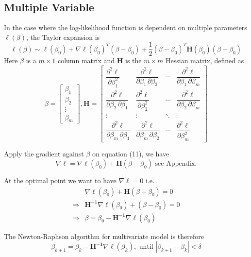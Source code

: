 \documentclass[12pt, oneside]{article}
\begin{document}
\subsection{Multiple Variable}
In the case where the log-likelihood function is dependent on multiple parameters $\ell({\beta})$, the Taylor expansion is
\begin{equation}
\ell({\beta})\sim \ell( {\beta_0} )+\nabla\ell(\beta_0)^T({\beta}-{\beta_0})+\frac{1}{2}(\beta-\beta_0)^T\mathbf{H}(\beta_0)(\beta-\beta_0)
\end{equation}
Here $\beta$ is a $m\times 1$ column matrix and $\mathbf{H}$ is the $m\times m$ Hessian matrix, defined as
$$
\beta=\begin{bmatrix}
    \beta_1\\[2.2ex]
    \beta_2\\[2.2ex]
	\vdots\\[2.2ex]
    \beta_m
\end{bmatrix}, 
\mathbf {H}
={\begin{bmatrix}
{\dfrac {\partial^{2}\ell}{\partial \beta_{1}^{2}}}
&{\dfrac {\partial^{2}\ell}{\partial \beta_{1}\,\partial \beta_{2}}}
&\cdots 
&{\dfrac {\partial ^{2}\ell}{\partial \beta_{1}\,\partial \beta_{m}}}
\\[2.2ex]
{\dfrac {\partial ^{2}\ell}{\partial \beta_{2}\,\partial \beta_{1}}}
&{\dfrac {\partial ^{2}\ell}{\partial \beta_{2}^{2}}}
&\cdots 
&{\dfrac {\partial ^{2}\ell}{\partial \beta_{2}\,\partial \beta_{m}}}\\[2.2ex]
\vdots &\vdots &\ddots &\vdots \\[2.2ex]
{\dfrac {\partial ^{2}\ell}{\partial \beta_{m}\,\partial \beta_{1}}}
&{\dfrac {\partial ^{2}\ell}{\partial \beta_{m}\,\partial \beta_{2}}}
&\cdots 
&{\dfrac {\partial ^{2}\ell}{\partial \beta_{m}^{2}}}
\end{bmatrix}}
$$

Apply the gradient against $\beta$ on equation (11), we have 
$$\nabla{\ell}=\nabla\ell(\beta_0)+\mathbf{H}(\beta-\beta_0) \text{ see Appendix.}$$

At the optimal point we want to have $\nabla{\ell}=0$ i.e.
\begin{align*}
&\nabla\ell(\beta_0)+\mathbf{H}(\beta-\beta_0)=0\\
\Rightarrow
&\mathbf{H^{-1}}\nabla\ell(\beta_0)+(\beta-\beta_0)=0\\
\Rightarrow
&\beta=\beta_0-\mathbf{H^{-1}}\nabla\ell(\beta_0)
\end{align*}

The Newton-Raphson algorithm for multivariate model is therefore 
\begin{equation}
\beta_{k+1}=\beta_{k}-\mathbf{H^{-1}}\nabla\ell(\beta_k), \text { until } |\beta_{k+1}-\beta_{k}|<\delta
\end{equation}
\end{document}
